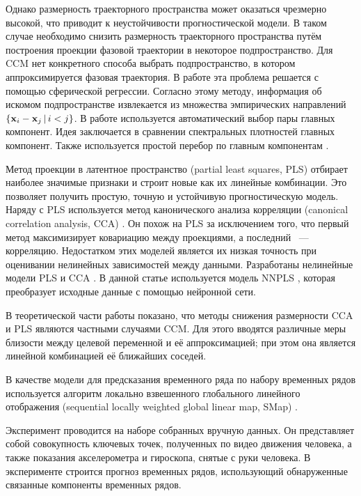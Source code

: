 \documentclass[a4paper, 12pt]{article}
\begin{document}
Однако размерность траекторного пространства может оказаться чрезмерно высокой, что приводит к неустойчивости прогностической модели.
В таком случае необходимо снизить размерность траекторного пространства путём построения проекции фазовой траектории в некоторое подпространство. Для CCM нет конкретного способа выбрать подпространство, в котором аппроксимируется фазовая траектория.
В работе \citep{usmanova2020sphere_regr} эта проблема решается с помощью сферической регрессии. Согласно этому методу, информация об искомом подпространстве извлекается из множества эмпирических направлений $\{ \mathbf{x}_i - \mathbf{x}_j\, | \, i < j \}$.
В работе \citep{alexandrov2005automatic} используется автоматический выбор пары главных компонент. Идея заключается в сравнении спектральных плотностей главных компонент. Также используется простой перебор по главным компонентам \citep{usmanova2019dependencies}.

Метод проекции в латентное пространство (partial least squares, PLS) \citep{rosipal2011nonlinear, rosipal2005overview} отбирает наиболее значимые признаки и строит новые как их линейные комбинации. 
Это позволяет получить простую, точную и устойчивую прогностическую модель.
Наряду с PLS используется метод канонического анализа корреляции (canonical correlation analysis, CCA) \citep{hardoon2004canonical}. 
Он похож на PLS за исключением того, что первый метод максимизирует ковариацию между проекциями, а последний ~--- корреляцию. 
Недостатком этих моделей является их низкая точность при оценивании нелинейных зависимостей между данными.
Разработаны нелинейные модели PLS \citep{qin1992nonlinear, hiden1998non} и CCA \citep{lai2000kernel, andrew2013deep}.
В данной статье используется модель NNPLS \citep{bulut2014new}, которая преобразует исходные данные с помощью нейронной сети. 

В теоретической части работы показано, что методы снижения размерности CCA и PLS являются частными случаями CCM. 
Для этого вводятся различные меры близости между целевой переменной и её аппроксимацией; при этом она является линейной комбинацией её ближайших соседей. 

В качестве модели для предсказания временного ряда по набору временных рядов используется алгоритм локально взвешенного глобального линейного отображения (sequential locally weighted global linear map, SMap) \citep{sugihara1994nonlinear}.

Эксперимент проводится на наборе собранных вручную данных. Он представляет собой совокупность ключевых точек, полученных 
по видео движения человека, а также показания акселерометра и гироскопа, снятые с руки человека. 
В эксперименте строится прогноз временных рядов, использующий обнаруженные связанные компоненты временных рядов.
\end{document}
